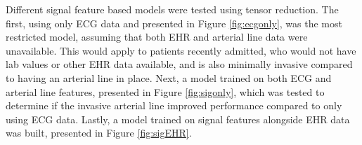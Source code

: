 Different signal feature based models were tested using tensor reduction. The first, using only ECG data and presented in Figure \ref{fig:ecgonly}, was the most restricted model, assuming that both EHR and arterial line data were unavailable. This would apply to patients recently admitted, who would not have lab values or other EHR data available, and is also minimally invasive compared to having an arterial line in place. Next, a model trained on both ECG and arterial line features, presented in Figure \ref{fig:sigonly}, which was tested to determine if the invasive arterial line improved performance compared to only using ECG data. Lastly, a model trained on signal features alongside EHR data was built, presented in Figure \ref{fig:sigEHR}.
